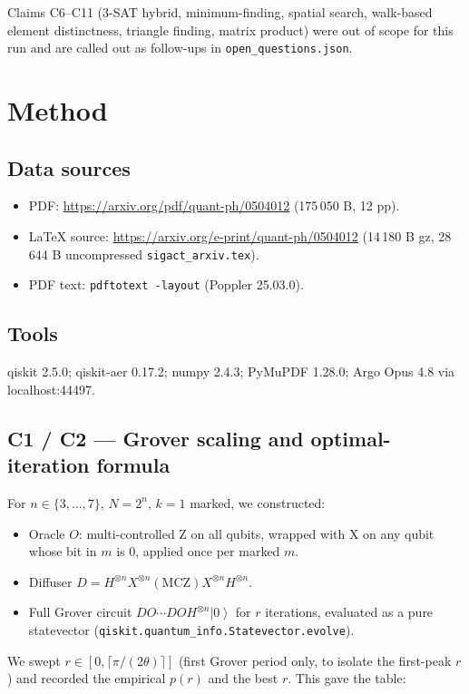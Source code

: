 \documentclass[11pt]{article}
\begin{document}
Claims C6--C11 (3-SAT hybrid, minimum-finding, spatial search, walk-based
element distinctness, triangle finding, matrix product) were out of scope
for this run and are called out as follow-ups in
\texttt{open\_questions.json}.

\section{Method}

\subsection{Data sources}
\begin{itemize}
\item PDF: \url{https://arxiv.org/pdf/quant-ph/0504012} (175\,050 B, 12 pp).
\item \LaTeX{} source: \url{https://arxiv.org/e-print/quant-ph/0504012}
      (14\,180 B gz, 28\,644 B uncompressed \texttt{sigact\_arxiv.tex}).
\item PDF text: \texttt{pdftotext -layout} (Poppler 25.03.0).
\end{itemize}

\subsection{Tools}
qiskit 2.5.0; qiskit-aer 0.17.2; numpy 2.4.3; PyMuPDF 1.28.0; Argo Opus 4.8 via
localhost:44497.

\subsection{C1 / C2 --- Grover scaling and optimal-iteration formula}
For $n \in \{3,\dots,7\}$, $N=2^n$, $k=1$ marked, we constructed:
\begin{itemize}
\item Oracle $O$: multi-controlled Z on all qubits, wrapped with X on any
      qubit whose bit in $m$ is 0, applied once per marked $m$.
\item Diffuser $D = H^{\otimes n} X^{\otimes n} (\mathrm{MCZ}) X^{\otimes n} H^{\otimes n}$.
\item Full Grover circuit $D O \cdots D O H^{\otimes n} \left|0\right\rangle$
      for $r$ iterations, evaluated as a pure statevector
      (\texttt{qiskit.quantum\_info.Statevector.evolve}).
\end{itemize}
We swept $r \in [0, \lceil \pi/(2\theta)\rceil]$ (first Grover period only,
to isolate the first-peak $r$) and recorded the empirical $p(r)$ and the
best $r$. This gave the table:
\end{document}
